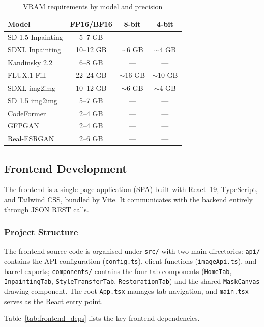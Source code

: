 \documentclass[12pt,a4paper]{report}
\begin{document}
\begin{table}[H]
\centering
\caption{VRAM requirements by model and precision}
\label{tab:vram_requirements}
\begin{tabularx}{\textwidth}{X c c c}
\toprule
\textbf{Model} & \textbf{FP16/BF16} & \textbf{8-bit} & \textbf{4-bit} \\
\midrule
SD 1.5 Inpainting & 5--7 GB & --- & --- \\
SDXL Inpainting & 10--12 GB & $\sim$6 GB & $\sim$4 GB \\
Kandinsky 2.2 & 6--8 GB & --- & --- \\
FLUX.1 Fill & 22--24 GB & $\sim$16 GB & $\sim$10 GB \\
SDXL img2img & 10--12 GB & $\sim$6 GB & $\sim$4 GB \\
SD 1.5 img2img & 5--7 GB & --- & --- \\
CodeFormer & 2--4 GB & --- & --- \\
GFPGAN & 2--4 GB & --- & --- \\
Real-ESRGAN & 2--6 GB & --- & --- \\
\bottomrule
\end{tabularx}
\end{table}

\subsection{Frontend Development}
\label{sec:frontend}

The frontend is a single-page application (SPA) built with React~19, TypeScript, and Tailwind CSS, bundled by Vite. It communicates with the backend entirely through JSON REST calls.

\subsubsection{Project Structure}
\label{sec:frontend_structure}

The frontend source code is organised under \texttt{src/} with two main directories: \texttt{api/} contains the API configuration (\texttt{config.ts}), client functions (\texttt{imageApi.ts}), and barrel exports; \texttt{components/} contains the four tab components (\texttt{HomeTab}, \texttt{InpaintingTab}, \texttt{StyleTransferTab}, \texttt{RestorationTab}) and the shared \texttt{MaskCanvas} drawing component. The root \texttt{App.tsx} manages tab navigation, and \texttt{main.tsx} serves as the React entry point.

Table~\ref{tab:frontend_deps} lists the key frontend dependencies.
\end{document}
